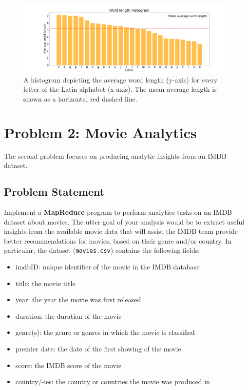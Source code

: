 \documentclass[acmlarge]{acmart}
\begin{document}

\begin{figure}[tb!]
  \centering
  \includegraphics[width=\linewidth]{figures/download}
  \caption{A histogram depicting the average word length (y-axis) for every letter of the Latin alphabet (x-axis). The mean average length is shown as a horizontal red dashed line.}
  \label{img:histogram:word_lengths}
\end{figure}

\section{Problem 2: Movie Analytics}
\label{sec:problem2}
The second problem focuses on producing analytic insights from an IMDB dataset.


\subsection{Problem Statement}
Implement a \textbf{MapReduce} program to perform analytics tasks on an IMDB dataset about movies. The utter goal of your analysis would be to extract useful insights from the available movie data that will assist the IMDB team provide better recommendations for movies, based on their genre and/or country. In particular, the dataset (\texttt{movies.csv}) contains the following fields:
\begin{itemize}
  \item imdbID: unique identifier of the movie in the IMDB database
  \item title: the movie title
  \item year: the year the movie was first released
  \item duration: the duration of the movie
  \item genre(s): the genre or genres in which the movie is classified
  \item premier date: the date of the first showing of the movie
  \item score: the IMDB score of the movie
  \item country/-ies: the country or countries the movie was produced in
\end{itemize}
\end{document}

